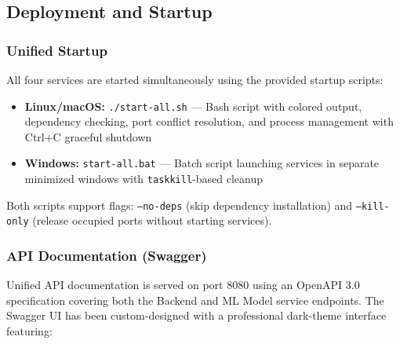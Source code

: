 \documentclass[12pt]{article}
\begin{document}

	\subsection{Deployment and Startup}

	\subsubsection{Unified Startup}

	All four services are started simultaneously using the provided startup scripts:

	\begin{itemize}
		\item \textbf{Linux/macOS:} \texttt{./start-all.sh} --- Bash script with colored output, dependency checking, port conflict resolution, and process management with Ctrl+C graceful shutdown
		\item \textbf{Windows:} \texttt{start-all.bat} --- Batch script launching services in separate minimized windows with \texttt{taskkill}-based cleanup
	\end{itemize}

	Both scripts support flags: \texttt{--no-deps} (skip dependency installation) and \texttt{--kill-only} (release occupied ports without starting services).

	\subsubsection{API Documentation (Swagger)}

	Unified API documentation is served on port 8080 using an OpenAPI 3.0 specification covering both the Backend and ML Model service endpoints. The Swagger UI has been custom-designed with a professional dark-theme interface featuring:
\end{document}
